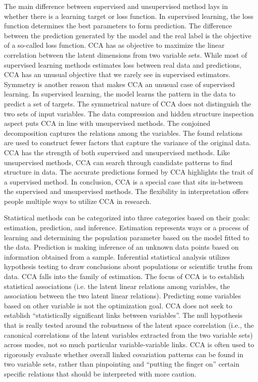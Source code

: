 The main difference between supervised and unsupervised method lays in whether there is a learning target or loss function. In supervised learning, the loss function determines the best parameters to form prediction. The difference between the prediction generated by the model and the real label is the objective of a so-called loss function. CCA has as objective to maximize the linear correlation between the latent dimensions from two variable sets. While most of supervised learning methods estimates loss between real data and predictions, CCA has an unusual objective that we rarely see in supervised estimators.  Symmetry is another reason that makes CCA an unusual case of supervised learning. In supervised learning, the model learns the pattern in the data to predict a set of targets. The symmetrical nature of CCA does not distinguish the two sets of input variables. The data compression and hidden structure inspection aspect puts CCA in line with unsupervised methods. The conjoined decomposition captures the relations among the variables. The found relations are used to construct fewer factors that capture the variance of the original data. CCA has the strength of both supervised and unsupervised methods. Like unsupervised methods, CCA can search through candidate patterns to find structure in data. The accurate predictions formed by CCA highlights the trait of a supervised method. In conclusion, CCA is a special case that sits in-between the supervised and unsupervised methods. The flexibility in interpretation offers people multiple ways to utilize CCA in research.

Statistical methods can be categorized into three categories based on their goals: estimation, prediction, and inference.  Estimation represents ways or a process of learning and determining the population parameter based on the model fitted to the data. Prediction is making inference of an unknown data points based on information obtained from a sample. Inferential statistical analysis utilizes hypothesis testing to draw conclusions about populations or scientific truths from data. CCA falls into the family of estimation. The focus of CCA is to establish statistical associations (i.e. the latent linear relations among variables, the association between the two latent linear relations). Predicting some variables based on other variable is not the optimization goal. CCA does not seek to establish “statistically significant links between variables”. The null hypothesis that is really tested around the robustness of the latent space correlation (i.e., the canonical correlations of the latent variables extracted from the two variable sets) across modes, not so much particular variable-variable links. CCA is often used to rigorously evaluate whether overall linked covariation patterns can be found in two variable sets, rather than pinpointing and “putting the finger on” certain specific relations that should be interpreted with more caution.

